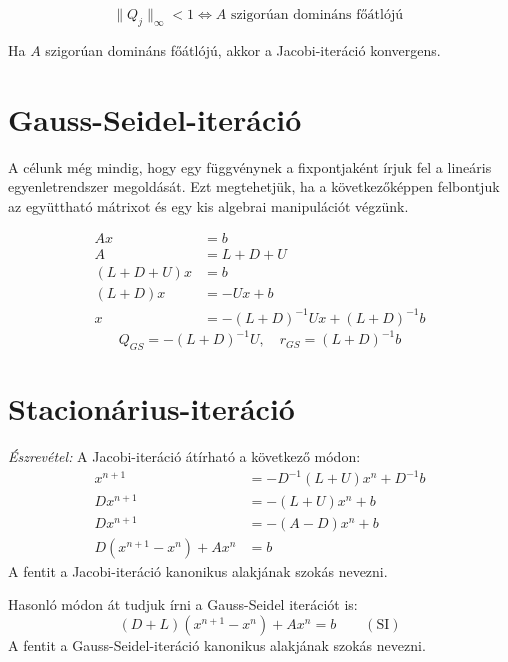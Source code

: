 \begin{allitas}
    \begin{equation*}
        \| Q_{j} \|_{\infty} < 1 \iff A \text{ szigorúan domináns főátlójú }
    \end{equation*}
\end{allitas}

\begin{kov}
    Ha $A$ szigorúan domináns főátlójú, akkor a Jacobi-iteráció konvergens.
\end{kov}

\section{Gauss-Seidel-iteráció}
A célunk még mindig, hogy egy függvénynek a fixpontjaként írjuk fel a lineáris egyenletrendszer megoldását. Ezt megtehetjük, ha a következőképpen felbontjuk az együttható mátrixot és egy kis algebrai manipulációt végzünk.

\begin{align*}
    Ax & = b \\
    A & = L + D + U \\
    (L+D+U)x & = b \\
    (L+D)x & = -Ux + b \\
    x & = -(L+D)^{-1}Ux + (L+D)^{-1}b
\end{align*}
\begin{equation*}
    Q_{GS} = -(L+D)^{-1}U, \quad r_{GS} = (L+D)^{-1}b
\end{equation*}

\section{Stacionárius-iteráció}
\textit{Észrevétel:} A Jacobi-iteráció átírható a következő módon:
\begin{align*}
    x^{n+1} & = -D^{-1}(L+U)x^{n} + D^{-1}b \\
    Dx^{n+1} & = - (L+U)x^{n} + b \\
    Dx^{n+1} & = -(A - D)x^{n} + b \\
    D(x^{n+1} - x^{n}) + Ax^{n} & = b
\end{align*}
A fentit a Jacobi-iteráció kanonikus alakjának szokás nevezni.

Hasonló módon át tudjuk írni a Gauss-Seidel iterációt is:
\begin{equation*}
    (D+L)(x^{n+1}-x^{n})+Ax^{n}=b \quad \quad (\text{SI})
\end{equation*}
A fentit a Gauss-Seidel-iteráció kanonikus alakjának szokás nevezni.

